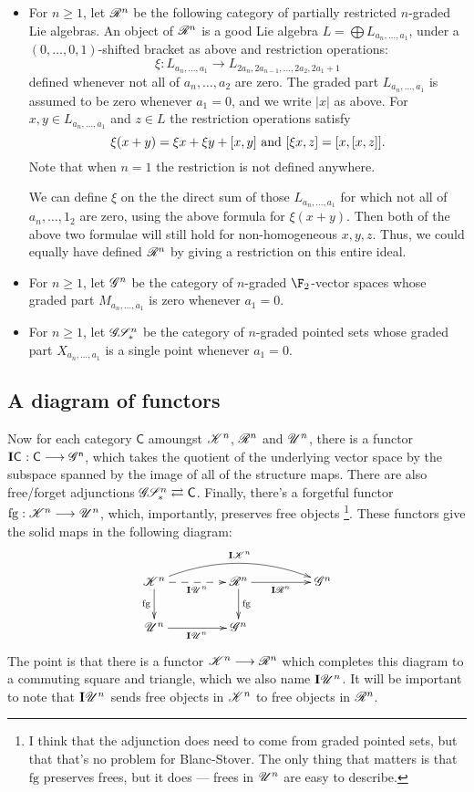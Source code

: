 \documentclass[11pt]{article}
\newcommand{\LL}[1]{{\scrK}^{#1}}%
\newcommand{\PR}[1]{\scrR^{#1}}%
\newcommand{\GR}[1]{\scrG^{#1}}%
\newcommand{\GS}[1]{\scrG\!\scrS^{#1}_*}
\newcommand{\nontop}[1]{\scrU^{#1}}%
\newcommand{\restn}[1]{\xi{#1}}
\newcommand{\Ind}[2][]{\mathbf{I}{#2}_{#1}}%
\newcommand{\forget}{\mathrm{fg}}
\begin{document}
\begin{itemize}
\item 
For $n\geq1$, let $\PR{n}$ be the following category of partially restricted $n$-graded Lie algebras. An object of $\PR{n}$ is a good Lie algebra $L=\bigoplus L_{a_n,\ldots,a_1}$, under a $(0,\ldots,0,1)$-shifted bracket as above
and restriction operations:
\[\restn{}:L_{a_n,\ldots,a_1}\to L_{2a_n,2a_{n-1},\ldots,2a_2,2a_1+1}\]
defined whenever not all of $a_n,\ldots,a_{2}$ are zero. The graded part $L_{a_n,\ldots,a_1}$ is assumed to be zero whenever $a_1=0$, and we write $|x|$ as above. For $x,y\in L_{a_n,\ldots,a_1}$ and $z\in L$ the restriction operations satisfy \[\restn{(x+y)}=\restn{x}+\restn{y}+[x,y]\textup{ and }[\restn{x},z]=[x,[x,z]].\]
Note that when $n=1$ the restriction is not defined anywhere.
\begin{shaded}\noindent
We can define $\restn{}$ on the the direct sum of those $L_{a_n,\ldots,a_1}$ for which not all of $a_n,\ldots,1_2$ are zero, using the above formula for $\restn{(x+y)}$. Then both of the above two formulae will still hold for non-homogeneous $x,y,z$. Thus, we could equally have defined $\PR{n}$ by giving a restriction on this entire ideal.
\end{shaded}

\item For $n\geq1$, let $\GR{n}$ be the category of $n$-graded $\F_2$-vector spaces whose graded part $M_{a_n,\ldots,a_1}$ is zero whenever $a_1=0$.
\item For $n\geq1$, let $\GS{n}$ be the category of $n$-graded pointed sets whose graded part $X_{a_n,\ldots,a_1}$ is a single point whenever $a_1=0$.
\end{itemize}

\subsection*{A diagram of functors}
Now for each category $\mathsf{C}$ amoungst $\LL{n}$, $\PR{n}$ and $\nontop{n}$, there is a functor $\Ind{\mathsf{C}}:\mathsf{C\overset{}{\to}\GR{n}}$, which takes the quotient of the underlying vector space by the subspace spanned by the image of all of the structure maps. There are also free/forget adjunctions $\GS{n} \rightleftarrows \mathsf{C}$. Finally, there's a forgetful functor $\forget:\LL{n}\to\nontop{n}$, which, importantly, preserves  free objects%
\footnote{I think that the adjunction does need to come from graded pointed sets, but that that's no problem for Blanc-Stover. The only thing that matters is that $\forget$ preserves frees, but it does --- frees in $\nontop{n}$ are easy to describe.}. These functors give the solid maps in the following diagram:
\[\xymatrix@R=8mm@C=15mm@!C{
\LL{n}
\ar@/^1.5em/[rr]^-{\Ind{\LL{n}}}
\ar[d]_-{\forget}
\ar@{-->}[r]_-{\Ind{\nontop{n}}}
&%
\PR{n}
\ar[d]^-{\forget}
\ar[r]_-{\Ind{\PR{n}}}
&%
\GR{n}
\\%
\nontop{n}
\ar[r]_-{\Ind{\nontop{n}}}
&%
\GR{n}
&%
}\]
The point is that there is a functor $\LL{n}\to\PR{n}$ which completes this diagram to a commuting square and triangle, which we also name $\Ind{\nontop{n}}$. It will be important to note that $\Ind{\nontop{n}}$ sends free objects in $\LL{n}$ to free objects in $\PR{n}$.
\end{document}
